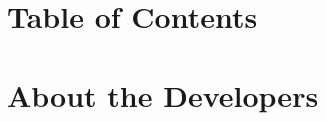 \documentclass[10pt]{book}
\begin{document}
\chapter{Table of Contents}
\chapter{About the Developers}
\end{document}
